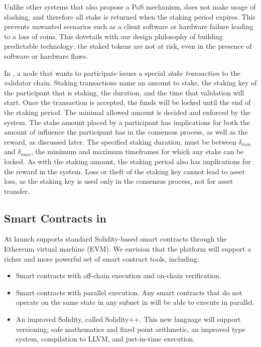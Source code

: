 \documentclass[runningheads]{llncs}
\begin{document}
Unlike other systems that also propose a PoS mechanism, \AVATokenName{} does not make usage of slashing, and therefore all stake is returned when the staking period expires. 
This prevents unwanted scenarios such as a client software or hardware failure leading to a loss of coins. 
This dovetails with our design philosophy of building predictable technology: the staked tokens are not at risk, even in the presence of software or hardware flaws.

In \AVAPlatformName, a node that wants to participate issues a special \emph{stake transaction} to the validator chain.
Staking transactions name an amount to stake, the staking key of the participant that is staking, the duration, and the time that validation will start. 
Once the transaction is accepted, the funds will be locked until the end of the staking period. The minimal allowed amount is decided and enforced by the system. 
The stake amount placed by a participant has implications for both the amount of influence the participant has in the consensus process, as well as the reward, as discussed later. 
The specified staking duration, must be between $\delta_{min}$ and $\delta_{max}$, the minimum and maximum timeframes for which any stake can be locked. 
As with the staking amount, the staking period also has implications for the reward in the system. 
Loss or theft of the staking key cannot lead to asset loss, as the staking key is used only in the consensus process, not for asset transfer.


\subsection{Smart Contracts in \AVATokenName}
At launch \AVAPlatformName{} supports standard Solidity-based smart contracts through the Ethereum virtual machine (EVM). We envision that the platform will support a richer and more powerful set of smart contract tools, including:
\begin{itemize}
\item Smart contracts with off-chain execution and on-chain verification.
\item Smart contracts with parallel execution. Any smart contracts that do not operate on the same state in any subnet in \AVAPlatformName{} will be able to execute in parallel.
\item An improved Solidity, called Solidity++. This new language will support versioning, safe mathematics and fixed point arithmetic, an improved type system, compilation to LLVM, and just-in-time execution. 
\end{itemize}
\end{document}
